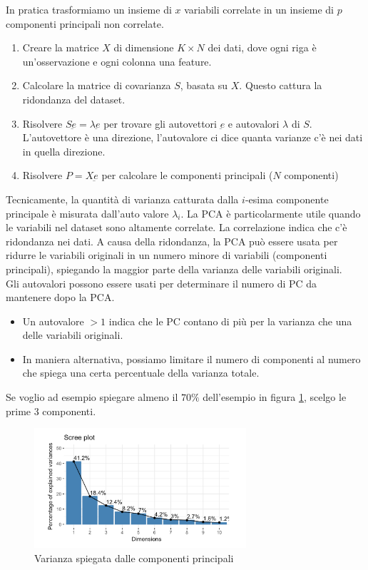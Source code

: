 \documentclass{../main.tex}[subfiles]
\begin{document}
In pratica trasformiamo un insieme di $x$ variabili correlate in un insieme di $p$ componenti principali non correlate.
\begin{enumerate}
	\item Creare la matrice $X$ di dimensione $K \times N$ dei dati, dove ogni riga è un'osservazione e ogni colonna una feature.
	\item Calcolare la matrice di covarianza $S$, basata su $X$. Questo cattura la ridondanza del dataset.
	\item Risolvere $S\underbar{e}=\lambda \underbar{e}$ per trovare gli autovettori $\underbar{e}$ e autovalori $\lambda$ di $S$. L'autovettore è una direzione, l'autovalore ci dice quanta varianze c'è nei dati in quella direzione.
	\item Risolvere $P=X\underbar{e}$ per calcolare le componenti principali ($N$ componenti)
\end{enumerate}
Tecnicamente, la quantità di varianza catturata dalla $i$-esima componente principale è misurata dall'auto valore $\lambda_i$.
La PCA è particolarmente utile quando le variabili nel dataset sono altamente correlate.
La correlazione indica che c'è ridondanza nei dati. A causa della ridondanza, la PCA può essere usata per ridurre le variabili originali in un numero minore di variabili (componenti principali), spiegando la maggior parte della varianza delle variabili originali.
\\
Gli autovalori possono essere usati per determinare il numero di PC da mantenere dopo la PCA.
\begin{itemize}
	\item Un autovalore $>1$ indica che le PC contano di più per la varianza che una delle variabili originali.
	\item In maniera alternativa, possiamo limitare il numero di componenti al numero che spiega una certa percentuale della varianza totale. 
\end{itemize}
Se voglio ad esempio spiegare almeno il $70\%$ dell'esempio in figura \ref{fig:pcaVarianza}, scelgo le prime 3 componenti.
\begin{figure}[H]
	\centering
	\includegraphics[width=0.7\textwidth]{pictures/pcaVarianza.png}
	\caption{Varianza spiegata dalle componenti principali}
	\label{fig:pcaVarianza}
\end{figure}
\end{document}
